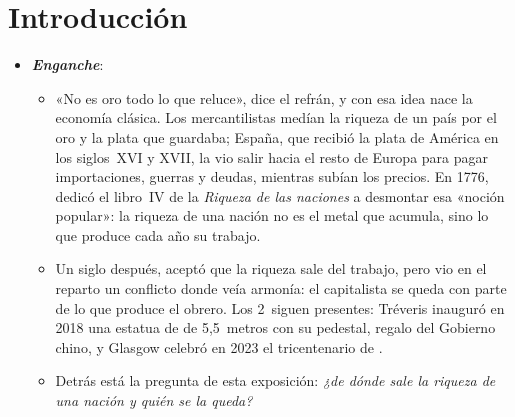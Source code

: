 \documentclass[11pt]{article}
\begin{document}
\tceetitulo

\section*{Introducción}

\begin{itemize}
\item \textbf{\emph{Enganche}}:
  \begin{itemize}
  \item «No es oro todo lo que reluce», dice el refrán, y con esa idea nace la economía clásica. Los mercantilistas medían la riqueza de un país por el oro y la plata que guardaba; España, que recibió la plata de América en los siglos~XVI y XVII, la vio salir hacia el resto de Europa para pagar importaciones, guerras y deudas, mientras subían los precios\nocite{Hamilton1934Treasure}. En 1776,  dedicó el libro~IV de la \emph{Riqueza de las naciones} a desmontar esa «noción popular»: la riqueza de una nación no es el metal que acumula, sino lo que produce cada año su trabajo\nocite{Smith1776Wealth}.
  \item Un siglo después,  aceptó que la riqueza sale del trabajo, pero vio en el reparto un conflicto donde  veía armonía: el capitalista se queda con parte de lo que produce el obrero. Los 2~siguen presentes: Tréveris inauguró en 2018 una estatua de  de 5,5~metros con su pedestal, regalo del Gobierno chino\nocite{Spiegel2018Marx}, y Glasgow celebró en 2023 el tricentenario de \nocite{Glasgow2023Smith300}.
  \item Detrás está la pregunta de esta exposición: \emph{¿de dónde sale la riqueza de una nación y quién se la queda?}
  \end{itemize}


\end{itemize}
\end{document}
